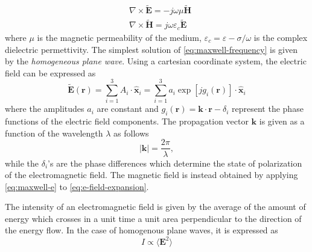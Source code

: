 \begin{subequations}\label{eq:maxwell-frequency}
\begin{align}
& \nabla \times \widetilde{\textbf{E}} = -j\omega\mu\widetilde{\textbf{H}} \label{eq:maxwell-e}\\
& \nabla \times \widetilde{\textbf{H}} = j\omega\varepsilon_c\widetilde{\textbf{E}}\label{eq:maxwell-h}
\end{align}
\end{subequations}
where $\mu$ is the magnetic permeability of the medium, $\varepsilon_c = \varepsilon - \sigma/\omega$ is the complex dielectric permettivity. The simplest solution of \autoref{eq:maxwell-frequency} is given by the \emph{homogeneous plane wave}. Using a cartesian coordinate system, the electric field can be expressed as
\begin{equation}\label{eq:e-field-expansion}
		\widetilde{\textbf{E}}(\textbf{r}) = \sum_{i=1}^3 A_i \cdot \hat{\textbf{x}}_i  = \sum_{i=1}^3 a_i \exp\left[jg_i(\textbf{r})\right]  \cdot \hat{\textbf{x}}_i
\end{equation}
where the amplitudes $a_i$ are constant and $g_i(\textbf{r}) = \textbf{k}\cdot\textbf{r} - \delta_i$ represent the phase functions of the electric field components. The propagation vector $\textbf{k}$ is given as a function of the wavelength $\lambda$ as follows
\begin{equation}
	|\textbf{k}| = \frac{2\pi}{\lambda},
\end{equation}
while the $\delta_i$'s are the phase differences which determine the state of polarization of the electromagnetic field. The magnetic field is instead obtained by applying \autoref{eq:maxwell-e} to \autoref{eq:e-field-expansion}. 

The intensity of an electromagnetic field is given by the average of the amount of energy which crosses in a unit time a unit area perpendicular to the direction of the energy flow. In the case of homogenous plane waves, it is expressed as
\begin{equation}\label{eq:intensity}
	I \propto \langle \textbf{E}^2 \rangle
\end{equation}

